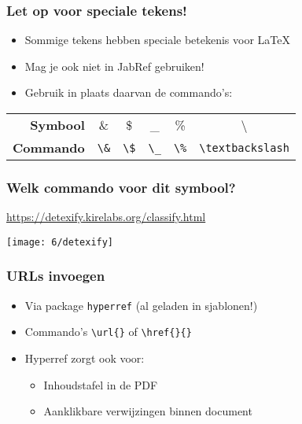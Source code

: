 \documentclass[aspectratio=169]{beamer}
\begin{document}
\begin{frame}[fragile]
  \frametitle{Let op voor speciale tekens!}

  \begin{itemize}
    \item Sommige tekens hebben speciale betekenis voor {\LaTeX}
    \item Mag je ook niet in JabRef gebruiken!
    \item Gebruik in plaats daarvan de commando's:
  \end{itemize}

  \bigskip

\begin{center}
  \begin{tabular}{rccccc}
    \toprule
    \textbf{Symbool}  & \&        & \$        & \_        & \%  & \textbackslash{} \\
    \textbf{Commando} & \verb+\&+ & \verb+\$+ & \verb+\_+ & \verb+\%+ & \verb+\textbackslash+\\
    \bottomrule
  \end{tabular}
\end{center}
\end{frame}

\begin{frame}
  \frametitle{Welk commando voor dit symbool?}

  \url{https://detexify.kirelabs.org/classify.html}

  \centering
  \texttt{[image: 6/detexify]}

\end{frame}

\begin{frame}[fragile]
  \frametitle{URLs invoegen}

  \begin{itemize}
    \item Via package \texttt{hyperref} (al geladen in sjablonen!)
    \item Commando's \verb+\url{}+ of \verb+\href{}{}+
    \item Hyperref zorgt ook voor:
          \begin{itemize}
            \item Inhoudstafel in de PDF
            \item Aanklikbare verwijzingen binnen document
          \end{itemize}
  \end{itemize}

\end{frame}
\end{document}
